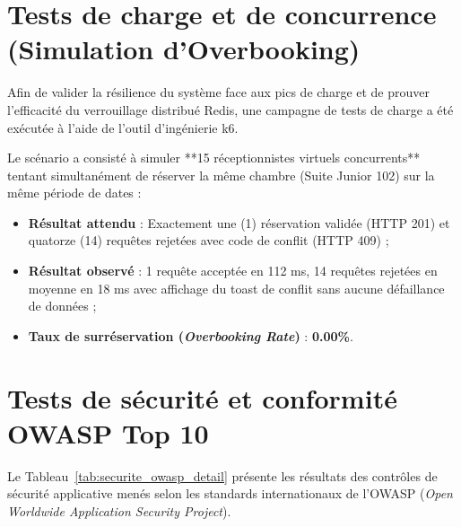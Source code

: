\documentclass[12pt,a4paper,oneside]{report}
\begin{document}
\section{Tests de charge et de concurrence (Simulation d'Overbooking)}

Afin de valider la résilience du système face aux pics de charge et de prouver l'efficacité du verrouillage distribué Redis, une campagne de tests de charge a été exécutée à l'aide de l'outil d'ingénierie k6.

Le scénario a consisté à simuler **15 réceptionnistes virtuels concurrents** tentant simultanément de réserver la même chambre (Suite Junior 102) sur la même période de dates :
\begin{itemize}
    \item \textbf{Résultat attendu} : Exactement une (1) réservation validée (HTTP 201) et quatorze (14) requêtes rejetées avec code de conflit (HTTP 409) ;
    \item \textbf{Résultat observé} : 1 requête acceptée en 112 ms, 14 requêtes rejetées en moyenne en 18 ms avec affichage du toast de conflit sans aucune défaillance de données ;
    \item \textbf{Taux de surréservation (\textit{Overbooking Rate})} : \textbf{0.00\%}.
\end{itemize}

\section{Tests de sécurité et conformité OWASP Top 10}

Le Tableau~\ref{tab:securite_owasp_detail} présente les résultats des contrôles de sécurité applicative menés selon les standards internationaux de l'OWASP (\textit{Open Worldwide Application Security Project}).
\end{document}
